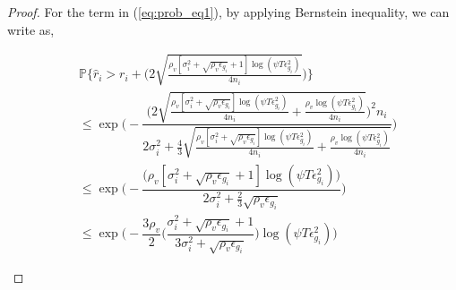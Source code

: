 \begin{proof}
For the term in (\ref{eq:prob_eq1}), by applying Bernstein inequality, we can write as,
\begin{small}
\begin{align*}
&\mathbb{P}\bigg\lbrace \hat{r}_{i}> r_{i} + \bigg(2\sqrt{\frac{\rho_v [\sigma_{i}^{2}+\sqrt{\rho_{v}\epsilon_{g_{i}}} + 1]\log(\psi T\epsilon_{g_{i}}^{2})}{4n_{i}}  } \bigg)\bigg\rbrace\\
&\leq \exp\bigg(- \dfrac{\bigg(2\sqrt{\frac{\rho_v [\sigma_{i}^{2}+\sqrt{\rho_{v}\epsilon_{g_{i}}}]\log(\psi T\epsilon_{g_{i}}^{2})}{4n_{i}} + \frac{\rho_v \log{(\psi T\epsilon_{g_{i}}^{2})}}{4 n_{i}}}\bigg)^{2}n_{i}}{2\sigma_{i}^{2}+\frac{4}{3}\sqrt{\frac{\rho_v [\sigma_{i}^{2}+\sqrt{\rho_{v}\epsilon_{g_{i}}}]\log(\psi T\epsilon_{g_{i}}^{2})}{4n_{i}}+\frac{\rho_v \log{(\psi T\epsilon_{g_{i}}^{2})}}{4 n_{i}}}}\bigg) \\
&\leq \exp\bigg(- \dfrac{\bigg(\rho_v [\sigma_{i}^{2}+\sqrt{\rho_{v}\epsilon_{g_{i}}} + 1]\log(\psi T\epsilon_{g_{i}}^{2})\bigg)}{2\sigma_{i}^{2}+\frac{2}{3}\sqrt{\rho_v \epsilon_{g_{i}}}} \bigg)\\
&\leq \exp\bigg(- \dfrac{3\rho_v}{2} \bigg(\dfrac{\sigma_{i}^{2}+\sqrt{\rho_{v}\epsilon_{g_{i}}}+1}{3\sigma_{i}^{2}+\sqrt{\rho_v \epsilon_{g_{i}}}}\bigg) \log(\psi T\epsilon_{g_{i}}^{2}) \bigg) 
\end{align*}
\end{small}
 

\end{proof}
